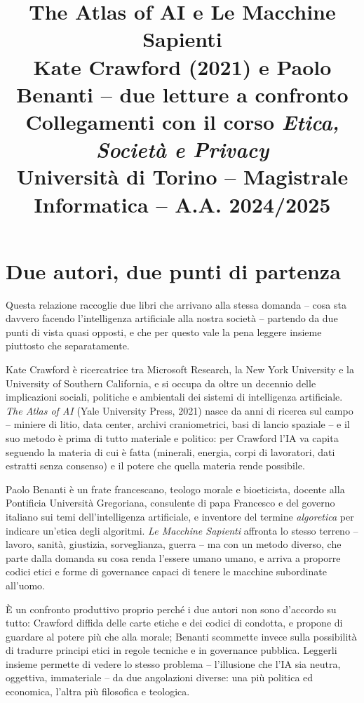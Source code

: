 \documentclass[a4paper,11pt]{article}
\title{\textbf{The Atlas of AI} e \textbf{Le Macchine Sapienti}\\[0.3em]
\large Kate Crawford (2021) e Paolo Benanti -- due letture a confronto\\[0.3em]
\normalsize Collegamenti con il corso \emph{Etica, Società e Privacy}\\
Università di Torino -- Magistrale Informatica -- A.A. 2024/2025}
\author{}
\date{}
\begin{document}
\maketitle
\tableofcontents
\newpage

\section{Due autori, due punti di partenza}

Questa relazione raccoglie due libri che arrivano alla stessa domanda -- cosa sta davvero facendo l'intelligenza artificiale alla nostra società -- partendo da due punti di vista quasi opposti, e che per questo vale la pena leggere insieme piuttosto che separatamente.

Kate Crawford è ricercatrice tra Microsoft Research, la New York University e la University of Southern California, e si occupa da oltre un decennio delle implicazioni sociali, politiche e ambientali dei sistemi di intelligenza artificiale. \emph{The Atlas of AI} (Yale University Press, 2021) nasce da anni di ricerca sul campo -- miniere di litio, data center, archivi craniometrici, basi di lancio spaziale -- e il suo metodo è prima di tutto materiale e politico: per Crawford l'IA va capita seguendo la materia di cui è fatta (minerali, energia, corpi di lavoratori, dati estratti senza consenso) e il potere che quella materia rende possibile.

Paolo Benanti è un frate francescano, teologo morale e bioeticista, docente alla Pontificia Università Gregoriana, consulente di papa Francesco e del governo italiano sui temi dell'intelligenza artificiale, e inventore del termine \emph{algoretica} per indicare un'etica degli algoritmi. \emph{Le Macchine Sapienti} affronta lo stesso terreno -- lavoro, sanità, giustizia, sorveglianza, guerra -- ma con un metodo diverso, che parte dalla domanda su cosa renda l'essere umano umano, e arriva a proporre codici etici e forme di governance capaci di tenere le macchine subordinate all'uomo.

È un confronto produttivo proprio perché i due autori non sono d'accordo su tutto: Crawford diffida delle carte etiche e dei codici di condotta, e propone di guardare al potere più che alla morale; Benanti scommette invece sulla possibilità di tradurre principi etici in regole tecniche e in governance pubblica. Leggerli insieme permette di vedere lo stesso problema -- l'illusione che l'IA sia neutra, oggettiva, immateriale -- da due angolazioni diverse: una più politica ed economica, l'altra più filosofica e teologica.
\end{document}
